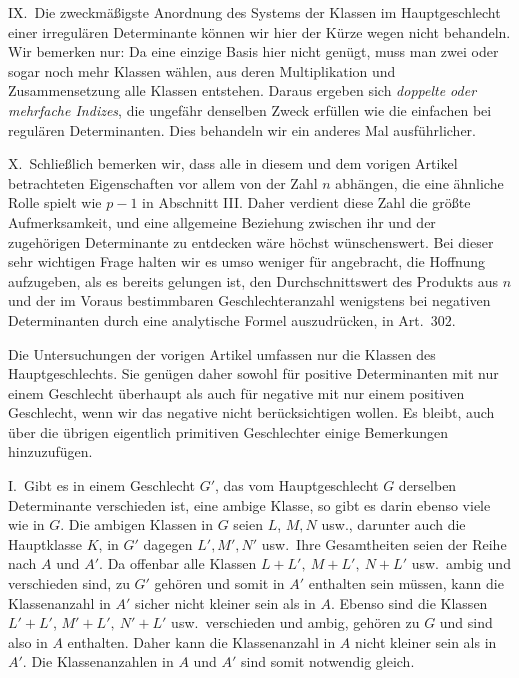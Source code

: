 IX.\ Die zweckmäßigste Anordnung des Systems der Klassen im Hauptgeschlecht einer irregulären Determinante können wir hier der Kürze wegen nicht behandeln. Wir bemerken nur: Da eine einzige Basis hier nicht genügt, muss man zwei
oder sogar noch mehr Klassen wählen, aus deren Multiplikation und Zusammensetzung alle Klassen entstehen. Daraus ergeben sich \textit{doppelte oder mehrfache Indizes}, die ungefähr denselben Zweck erfüllen wie die einfachen bei regulären Determinanten. Dies behandeln wir ein anderes Mal ausführlicher.

X.\ Schließlich bemerken wir, dass alle in diesem und dem vorigen Artikel betrachteten Eigenschaften vor allem von der Zahl \(n\) abhängen, die eine ähnliche Rolle spielt wie \(p-1\) in Abschnitt III. Daher verdient diese Zahl die größte Aufmerksamkeit, und eine allgemeine Beziehung zwischen ihr und der zugehörigen Determinante zu entdecken wäre höchst wünschenswert. Bei dieser sehr wichtigen Frage halten wir es umso weniger für angebracht, die Hoffnung aufzugeben, als es bereits gelungen ist, den Durchschnittswert des Produkts aus \(n\) und der im Voraus bestimmbaren Geschlechteranzahl wenigstens bei negativen Determinanten durch eine analytische Formel auszudrücken, in Art.\ \(302\).

Die Untersuchungen der vorigen Artikel umfassen nur die Klassen des Hauptgeschlechts. Sie genügen daher sowohl für positive Determinanten mit nur einem Geschlecht überhaupt als auch für negative mit nur einem positiven Geschlecht, wenn wir das negative nicht berücksichtigen wollen. Es bleibt, auch über die übrigen eigentlich primitiven Geschlechter einige Bemerkungen hinzuzufügen.

I.\ Gibt es in einem Geschlecht \(G'\), das vom Hauptgeschlecht \(G\) derselben Determinante verschieden ist, eine ambige Klasse, so gibt es darin ebenso viele wie in \(G\). Die ambigen Klassen in \(G\) seien \(L\), \(M,N\) usw., darunter auch die Hauptklasse \(K\), in \(G'\) dagegen \(L',M',N'\) usw.\ Ihre Gesamtheiten seien der Reihe nach \(A\) und \(A'\). Da offenbar alle Klassen \(L+L',\ M+L',\ N+L'\) usw.\ ambig und verschieden sind, zu \(G'\) gehören und somit in \(A'\) enthalten sein müssen, kann die Klassenanzahl in \(A'\) sicher nicht kleiner sein als in \(A\). Ebenso sind die Klassen \(L'+L'\), \(M'+L',\ N'+L'\) usw.\ verschieden und ambig, gehören zu \(G\) und sind also in \(A\) enthalten. Daher kann die Klassenanzahl in \(A\) nicht kleiner sein als in \(A'\). Die Klassenanzahlen in \(A\) und \(A'\) sind somit notwendig gleich.

